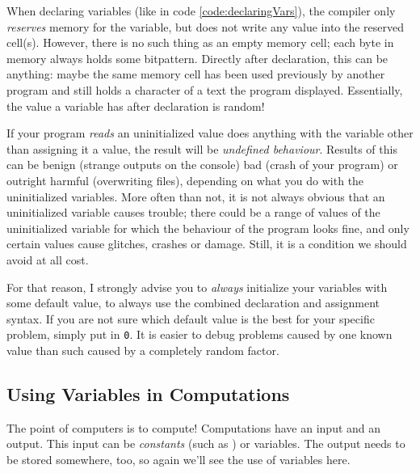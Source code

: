 \begin{hintbox}
When declaring variables (like in code \ref{code:declaringVars}), the compiler only \emph{reserves} memory for the variable, but does not write any value into the reserved cell(s). However, there is no such thing as an empty memory cell; each byte in memory always holds some bitpattern. Directly after declaration, this can be anything: maybe the same memory cell has been used previously by another program and still holds a character of a text the program displayed. Essentially, the value a variable has after declaration is random!
\end{hintbox}
%
\begin{hintbox}[]
If your program \emph{reads} an uninitialized value \ie does anything with the variable other than assigning it a value, the result will be \emph{undefined behaviour}. Results of this can be benign (\eg  strange outputs on the console) bad (\eg crash of your program) or outright harmful (\eg overwriting files), depending on what you do with the uninitialized variables. More often than not, it is not always obvious that an uninitialized variable causes trouble; there could be a range of values of the uninitialized variable for which the behaviour of the program looks fine, and only certain values cause glitches, crashes or damage. Still, it is a condition we should avoid at all cost.

For that reason, I strongly advise you to \emph{always} initialize your variables with some default value, \ie to always use the combined declaration and assignment syntax. If you are not sure which default value is the best for your specific problem, simply put in \texttt{0}. It is easier to debug problems caused by one known value than such caused by a completely random factor.
\end{hintbox}

\subsection{Using Variables in Computations}\label{sec:OperatorsArithmetic}
The point of computers is to compute\citationneeded! Computations have an input and an output. This input can be \emph{constants} (such as ) or variables. The output needs to be stored somewhere, too, so again we'll see the use of variables here.

